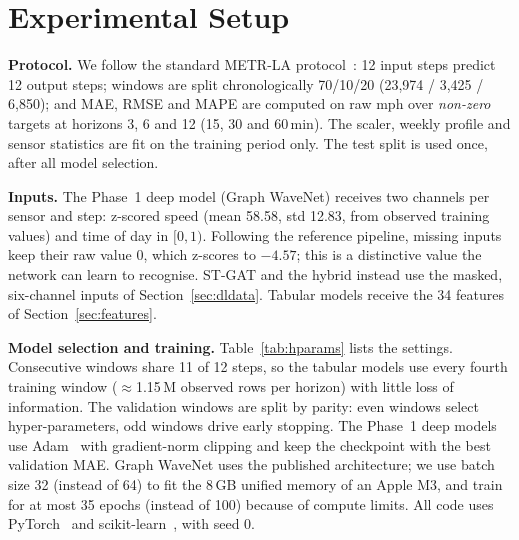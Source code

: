 \section{Experimental Setup}
\label{sec:setup}

\textbf{Protocol.} We follow the standard METR-LA protocol~\cite{li2018dcrnn,wu2019gwnet}:
12 input steps predict 12 output steps; windows are split chronologically 70/10/20
(23,974 / 3,425 / 6,850); and MAE, RMSE and MAPE are computed on raw mph over
\emph{non-zero} targets at horizons 3, 6 and 12 (15, 30 and 60\,min). The scaler,
weekly profile and sensor statistics are fit on the training period only. The test
split is used once, after all model selection.

\textbf{Inputs.} The Phase~1 deep model (Graph WaveNet) receives two channels per sensor and step: z-scored speed
(mean 58.58, std 12.83, from observed training values) and time of day in $[0,1)$.
Following the reference pipeline, missing inputs keep their raw value 0, which
z-scores to $-4.57$; this is a distinctive value the network can learn to recognise.
ST-GAT and the hybrid instead use the masked, six-channel inputs of
Section~\ref{sec:dldata}. Tabular models receive the 34 features of
Section~\ref{sec:features}.

\textbf{Model selection and training.} Table~\ref{tab:hparams} lists the settings.
Consecutive windows share 11 of 12 steps, so the tabular models use every fourth
training window ($\approx$1.15\,M observed rows per horizon) with little loss of
information. The validation windows are split by parity: even windows select
hyper-parameters, odd windows drive early stopping. The Phase~1 deep models use
Adam~\cite{kingma2015adam} with gradient-norm clipping and keep the checkpoint with
the best validation MAE. Graph WaveNet uses the published architecture; we use
batch size 32 (instead of 64) to fit the 8\,GB unified memory of an Apple M3, and
train for at most 35 epochs (instead of 100) because of compute limits. All code
uses PyTorch~\cite{paszke2019} and scikit-learn~\cite{pedregosa2011}, with seed 0.

